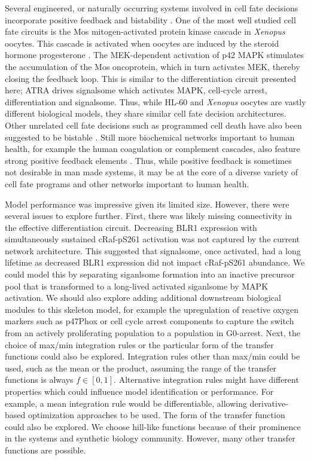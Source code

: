 \documentclass[12pt]{article}
\begin{document}
Several engineered, or naturally occurring systems involved in cell fate decisions incorporate positive feedback and bistability \cite{Ferrell:2002aa}.
One of the most well studied cell fate circuits is the Mos mitogen-activated protein kinase cascade in \textit{Xenopus} oocytes.
This cascade is activated when oocytes are induced by the steroid hormone progesterone \cite{Xiong:2003aa}.
The MEK-dependent activation of p42 MAPK stimulates the accumulation of the Mos oncoprotein, which in turn activates MEK, thereby closing the feedback loop.
This is similar to the differentiation circuit presented here; ATRA drives signalsome which activates MAPK, cell-cycle arrest, differentiation and signalsome.
Thus, while HL-60 and \textit{Xenopus} oocytes are vastly different biological models, they share similar cell fate decision architectures.
Other unrelated cell fate decisions such as programmed cell death have also been suggested to be bistable \cite{Bagci:2006aa}.
Still more biochemical networks important to human health, for example the human coagulation or complement cascades, also feature strong positive feedback elements \cite{Luan:2007aa}.
Thus, while positive feedback is sometimes not desirable in man made systems, it may be at the core of a diverse variety of
cell fate programs and other networks important to human health.

Model performance was impressive given its limited size. However, there were several issues to explore further.
First, there was likely missing connectivity in the effective differentiation circuit.
Decreasing BLR1 expression with simultaneously sustained cRaf-pS261 activation was not captured by the current network architecture.
This suggested that signalsome, once activated, had a long lifetime as decreased BLR1 expression did not impact cRaf-pS261 abundance.
We could model this by separating siganlsome formation into an inactive precursor pool that is transformed to a long-lived activated siganlsome by MAPK activation.
We should also explore adding additional downstream biological modules to this skeleton model, for example the upregulation of reactive oxygen markers such as p47Phox or
cell cycle arrest components to capture the switch from an actively proliferating population to a population in G0-arrest.
Next, the choice of max/min integration rules or the particular form of the transfer functions could also be explored.
Integration rules other than max/min could be used, such as the mean or the product, assuming the range of the transfer functions is always $f\in[0,1]$.
Alternative integration rules might have different properties which could influence model identification or performance.
For example, a mean integration rule would be differentiable, allowing derivative-based optimization approaches to be used.
The form of the transfer function could also be explored. We choose hill-like functions because of their
prominence in the systems and synthetic biology community. However, many other transfer functions are possible.
\end{document}
